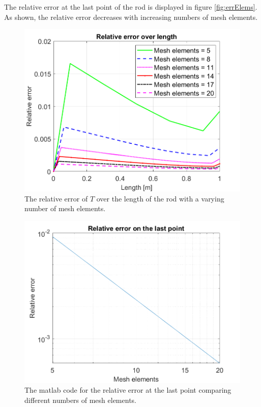 The relative error at the last point of the rod is displayed in figure \autoref{fig:errElems}. As shown, the relative error decreases with increasing numbers of mesh elements. 

\begin{minipage}[H]{.45\textwidth}
\begin{figure}[H]
    \centering
    \includegraphics[width=\textwidth]{figures/errLen.png}
    \caption{The relative error of $T$ over the length of the rod with a varying number of mesh elements.}
    \label{fig:errLen}
\end{figure}
\end{minipage}
\begin{minipage}[H]{.45\textwidth}
\begin{figure}[H]
    \centering
    \includegraphics[width=\textwidth]{figures/errElems.png}
    \caption{The matlab code for the relative error at the last point comparing different numbers of mesh elements.}
    \label{fig:errElems}
\end{figure}
\end{minipage}


